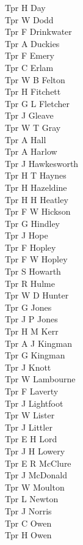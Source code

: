 \begin{multicols}{2}
  Tpr H Day \\
  Tpr W Dodd \\
  Tpr F Drinkwater \\
  Tpr A Duckies \\
  Tpr F Emery \\
  Tpr C Erlam \\
  Tpr W B Felton \\
  Tpr H Fitchett \\
  Tpr G L Fletcher \\
  Tpr J Gleave \\
  Tpr W T Gray \\
  Tpr A Hall \\
  Tpr A Harlow \\
  Tpr J Hawkesworth \\
  Tpr H T Haynes \\
  Tpr H Hazeldine \\
  Tpr H H Heatley \\
  Tpr F W Hickson \\
  Tpr G Hindley \\
  Tpr J Hope \\
  Tpr F Hopley \\
  Tpr F W Hopley \\
  Tpr S Howarth \\
  Tpr R Hulme \\
  Tpr W D Hunter \\
  Tpr G Jones \\
  Tpr J P Jones \\
  Tpr H M Kerr \\
  Tpr A J Kingman \\
  Tpr G Kingman \\
  Tpr J Knott \\
  Tpr W Lambourne \\
  Tpr F Laverty \\
  Tpr J Lightfoot \\
  Tpr W Lister \\
  Tpr J Littler \\
  Tpr E H Lord \\
  Tpr J H Lowery \\
  Tpr E R McClure \\
  Tpr J McDonald \\
  Tpr W Moulton \\
  Tpr L Newton \\
  Tpr J Norris \\
  Tpr C Owen \\
  Tpr H Owen \\

\end{multicols}
